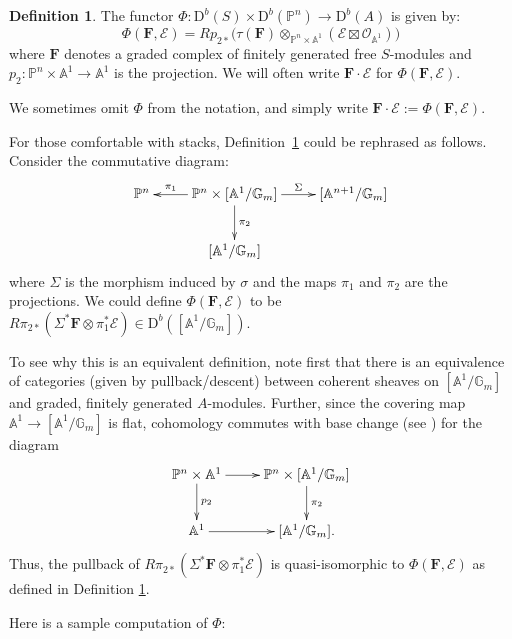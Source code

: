 \documentclass[12pt]{amsart}
\theoremstyle{definition}
\newtheorem{defn}[lemma]{Definition}
\theoremstyle{remark}
\newcommand{\Spec}{\operatorname{Spec}}
\newcommand{\kk}{\Bbbk}
\newcommand{\PP}{\mathbb{P}}
\renewcommand{\AA}{\mathbb{A}}
\newcommand{\GG}{\mathbb{G}}
\newcommand{\cO}{\mathcal{O}}
\newcommand{\cE}{\mathcal{E}}
\newcommand{\FF}{\mathbf{F}}
\newcommand{\DD}{\mathrm{D}}
\renewcommand{\P}{{\mathbb P}}
\begin{document}

\begin{defn} \label{defn:product} The functor $\Phi: \DD^{b}(S)\times \DD^b(\PP^n) \to \DD^{b}(A)$ is given by:
$$
\Phi(\FF,\cE) = Rp_{2*} \bigl(\tau(\FF)\otimes_{\P^{n}\times\AA^{1}} (\cE\boxtimes \cO_{\AA^{1}}) \bigr)
$$
where $\FF$ denotes a graded  complex of finitely generated free $S$-modules and
$p_2: \PP^{n}\times \AA^{1}\to \AA^{1}$ is the projection. We will often write
$\FF\cdot \cE$ for $\Phi(\FF,\cE)$.
\end{defn}
We sometimes omit $\Phi$ from the notation, and simply write 
$\FF\cdot \cE:=\Phi(\FF,\cE)$.

For those comfortable with stacks, Definition~\ref{defn:product}
could be rephrased as follows. Consider the commutative diagram:
\[
\xymatrix{
\PP^n&\PP^{n}\times [\AA^1/\GG_m]\ar[l]_-{\pi_{1}} \ar[r]^-{\Sigma} \ar[d]^{\pi_2}&[\AA^{n+1}/\GG_m]\\
&[\AA^1/\GG_m]&%
}
\]
where $\Sigma$ is the morphism induced by $\sigma$ and the maps $\pi_1$ and $\pi_2$ are the projections.  We could define $\Phi(\FF,\cE)$ to be $R\pi_{2*}\left( \Sigma^*\FF\otimes \pi_{1}^{*}\cE\right)\in \DD^b([\AA^1/\GG_m])$.

To see why this is an equivalent definition, note first  that there is an equivalence of categories (given by pullback/descent) between coherent sheaves on $[\AA^1/\GG_m]$ and graded, finitely generated $A$-modules. Further, since the covering map $\AA^1\to [\AA^1/\GG_m]$ is flat, cohomology commutes with base change (see \cite[0765]{stacks-project}) for the diagram
\[
\xymatrix{
\PP^n\times \AA^1\ar[r]\ar[d]^-{p_2}&\PP^{n}\times [\AA^1/\GG_m]\ar[d]^{\pi_2}\\
\AA^1\ar[r]&[\AA^1/\GG_m].
}
\]
Thus, the pullback of $R\pi_{2*}\left( \Sigma^*\FF\otimes \pi_{1}^{*}\cE\right)$ is quasi-isomorphic 
to $\Phi(\FF,\cE)$ as defined in Definition \ref{defn:product}.

Here is a sample computation of $\Phi$: 
\end{document}
